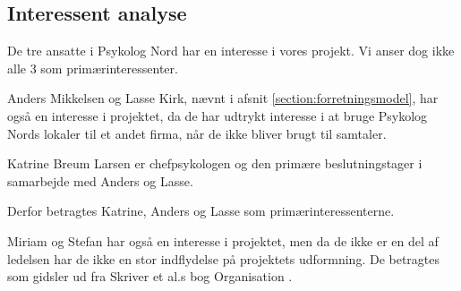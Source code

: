 \subsection{Interessent analyse}

De tre ansatte i Psykolog Nord har en interesse i vores projekt. Vi anser dog ikke alle 3 som primærinteressenter.

Anders Mikkelsen og Lasse Kirk, nævnt i afsnit \ref{section:forretningsmodel}, har også en interesse i projektet, da de har udtrykt interesse i at bruge Psykolog Nords lokaler til et andet firma, når de ikke bliver brugt til samtaler.

Katrine Breum Larsen er chefpsykologen og den primære beslutningstager i samarbejde med Anders og Lasse.

Derfor betragtes Katrine, Anders og Lasse som primærinteressenterne.

Miriam og Stefan har også en interesse i projektet, men da de ikke er en del af ledelsen har de ikke en stor indflydelse på projektets udformning.
De betragtes som gidsler ud fra Skriver et al.s bog Organisation \cite[s. 435]{interessentanalyse}.